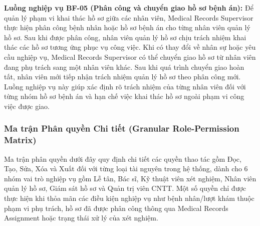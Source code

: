 \textbf{Luồng nghiệp vụ BF-05 (Phân công và chuyển giao hồ sơ bệnh án):}
Để quản lý phạm vi khai thác hồ sơ giữa các nhân viên, Medical Records Supervisor thực hiện phân công bệnh nhân hoặc hồ sơ bệnh án cho từng nhân viên quản lý hồ sơ. Sau khi được phân công, nhân viên quản lý hồ sơ chịu trách nhiệm khai thác các hồ sơ tương ứng phục vụ công việc. Khi có thay đổi về nhân sự hoặc yêu cầu nghiệp vụ, Medical Records Supervisor có thể chuyển giao hồ sơ từ nhân viên đang phụ trách sang một nhân viên khác. Sau khi quá trình chuyển giao hoàn tất, nhân viên mới tiếp nhận trách nhiệm quản lý hồ sơ theo phân công mới. Luồng nghiệp vụ này giúp xác định rõ trách nhiệm của từng nhân viên đối với từng nhóm hồ sơ bệnh án và hạn chế việc khai thác hồ sơ ngoài phạm vi công việc được giao.

\subsubsection{Ma trận Phân quyền Chi tiết (Granular Role-Permission Matrix)}

Ma trận phân quyền dưới đây quy định chi tiết các quyền thao tác gồm Đọc, Tạo, Sửa, Xóa và Xuất đối với từng loại tài nguyên trong hệ thống, dành cho 6 nhóm vai trò nghiệp vụ gồm Lễ tân, Bác sĩ, Kỹ thuật viên xét nghiệm, Nhân viên quản lý hồ sơ, Giám sát hồ sơ và Quản trị viên CNTT. Một số quyền chỉ được thực hiện khi thỏa mãn các điều kiện nghiệp vụ như bệnh nhân/lượt khám thuộc phạm vi phụ trách, hồ sơ đã được phân công thông qua Medical Records Assignment hoặc trạng thái xử lý của xét nghiệm.

